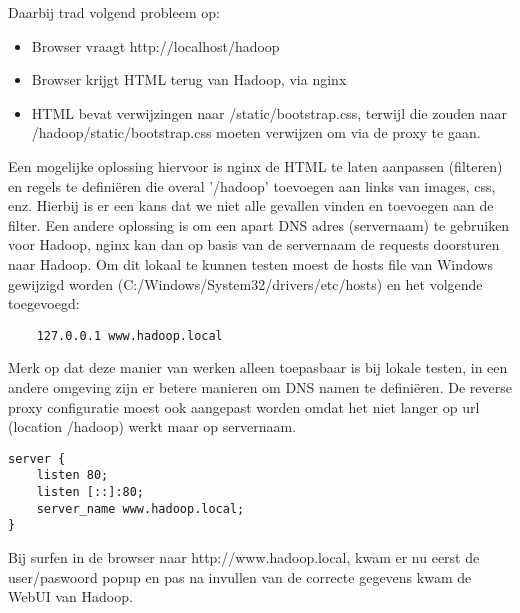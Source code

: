 Daarbij trad volgend probleem op:
\newline
\newline
\begin{itemize}
    \item Browser vraagt http://localhost/hadoop
    \item Browser krijgt HTML terug van Hadoop, via nginx
    \item HTML bevat verwijzingen naar /static/bootstrap.css, terwijl die zouden naar /hadoop/static/bootstrap.css moeten verwijzen om via de proxy te gaan.
\end{itemize}


Een mogelijke oplossing hiervoor is nginx de HTML te laten aanpassen (filteren) en regels te definiëren die overal '/hadoop' toevoegen aan links van images, css, enz. Hierbij is er een kans dat we niet alle gevallen vinden en toevoegen aan de filter.
Een andere oplossing is om een apart DNS adres (servernaam) te gebruiken voor Hadoop, nginx kan dan op basis van de servernaam de requests doorsturen naar Hadoop. Om dit lokaal te kunnen testen moest de hosts file van Windows gewijzigd worden 
\newline
(C:/Windows/System32/drivers/etc/hosts) en het volgende toegevoegd:
\begin{lstlisting}
    127.0.0.1 www.hadoop.local
\end{lstlisting}

Merk op dat deze manier van werken alleen toepasbaar is bij lokale testen, in een andere omgeving zijn er betere manieren om DNS namen te definiëren.
\newline
De reverse proxy configuratie moest ook aangepast worden omdat het niet langer op url (location /hadoop) werkt maar op servernaam.
\newline
\newline
\begin{lstlisting}
server {
    listen 80;
    listen [::]:80;
    server_name www.hadoop.local;
}
\end{lstlisting}

Bij surfen in de browser naar http://www.hadoop.local, kwam er nu eerst de user/paswoord popup en pas na invullen van de correcte gegevens kwam de WebUI van Hadoop.

